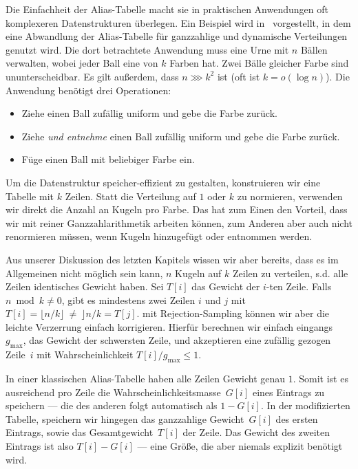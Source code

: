 Die Einfachheit der Alias-Tabelle macht sie in praktischen Anwendungen oft komplexeren Datenstrukturen überlegen.
Ein Beispiel wird in~\cite{DBLP:conf/esa/BerenbrinkHK0PT20} vorgestellt, in dem eine Abwandlung der Alias-Tabelle für ganzzahlige und dynamische Verteilungen genutzt wird.
Die dort betrachtete Anwendung muss eine Urne mit $n$ Bällen verwalten, wobei jeder Ball eine von $k$ Farben hat.
Zwei Bälle gleicher Farbe sind ununterscheidbar.
Es gilt außerdem, dass $n \ggg k^2$ ist (oft ist $k = o(\log n)$).
Die Anwendung benötigt drei Operationen:
\begin{itemize}
    \item Ziehe einen Ball zufällig uniform und gebe die Farbe zurück.
    \item Ziehe \emph{und entnehme} einen Ball zufällig uniform und gebe die Farbe zurück.
    \item Füge einen Ball mit beliebiger Farbe ein.
\end{itemize}

Um die Datenstruktur speicher-effizient zu gestalten, konstruieren wir eine Tabelle mit $k$ Zeilen.
Statt die Verteilung auf $1$ oder $k$ zu normieren, verwenden wir direkt die Anzahl an Kugeln pro Farbe.
Das hat zum Einen den Vorteil, dass wir mit reiner Ganzzahlarithmetik arbeiten können, zum Anderen aber auch nicht renormieren müssen, wenn Kugeln hinzugefügt oder entnommen werden.

Aus unserer Diskussion des letzten Kapitels wissen wir aber bereits, dass es im Allgemeinen nicht möglich sein kann, $n$ Kugeln auf $k$ Zeilen zu verteilen, s.d. alle Zeilen identisches Gewicht haben.
Sei $T[i]$ das Gewicht der $i$-ten Zeile.
Falls $n \bmod k \ne 0$, gibt es mindestens zwei Zeilen $i$ und $j$ mit  $T[i] = \lfloor n / k \rfloor\ \ne\ \rfloor n / k = T[j]$.
mit Rejection-Sampling können wir aber die leichte Verzerrung einfach korrigieren.
Hierfür berechnen wir einfach eingangs $g_\text{max}$, das Gewicht der schwersten Zeile, und akzeptieren eine zufällig gezogen Zeile~$i$ mit Wahrscheinlichkeit $T[i] / g_\text{max} \le 1$.

In einer klassischen Alias-Tabelle haben alle Zeilen Gewicht genau $1$.
Somit ist es ausreichend pro Zeile die Wahrscheinlichkeitsmasse~$G[i]$ eines Eintrags zu speichern --- die des anderen folgt automatisch als $1 - G[i]$.
In der modifizierten Tabelle, speichern wir hingegen das ganzzahlige Gewicht~$G[i]$ des ersten Eintrags, sowie das Gesamtgewicht~$T[i]$ der Zeile.
Das Gewicht des zweiten Eintrags ist also $T[i] - G[i]$ --- eine Größe, die aber niemals explizit benötigt wird.

